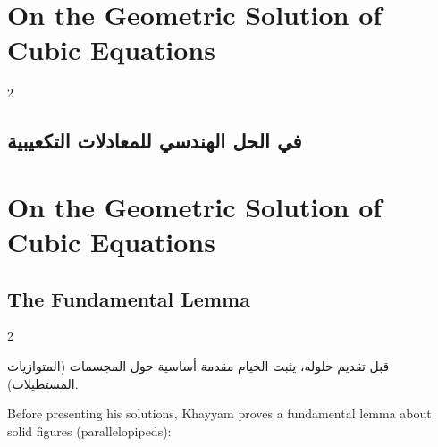 \documentclass[11pt,a4paper]{book}
\begin{document}
\clearpage
\section{On the Geometric Solution of Cubic Equations}
\label{sec:geometric}

\begin{paracol}{2}

\begin{Arabic}
\section*{في الحل الهندسي للمعادلات التكعيبية}
\end{Arabic}

\switchcolumn

\section*{On the Geometric Solution of Cubic Equations}

\end{paracol}

\subsection{The Fundamental Lemma}
\label{subsec:lemma}

\begin{paracol}{2}

\begin{Arabic}
قبل تقديم حلوله، يثبت الخيام مقدمة أساسية حول المجسمات (المتوازيات المستطيلات).
\end{Arabic}

\switchcolumn

Before presenting his solutions, Khayyam proves a fundamental lemma about solid figures (parallelopipeds):

\end{paracol}
\end{document}
